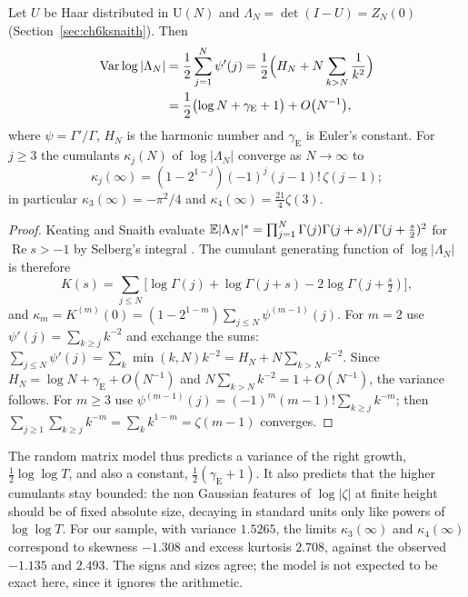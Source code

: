 \begin{proposition}\label{prop:09bks}
Let $U$ be Haar distributed in $\mathrm{U}(N)$ and $\Lambda_N=\det(I-U)=Z_N(0)$ (Section~\ref{sec:ch6ksnaith}). Then
\begin{align*}
\operatorname{Var}\log|\Lambda_N|&=\frac12\sum_{j=1}^N\psi'(j)=\frac12\Bigl(H_N+N\sum_{k>N}\frac1{k^2}\Bigr)\\
&=\frac12\bigl(\log N+\gamma_{\mathrm E}+1\bigr)+O\bigl(N^{-1}\bigr),
\end{align*}
where $\psi=\Gamma'/\Gamma$, $H_N$ is the harmonic number and $\gamma_{\mathrm E}$ is Euler's constant. For $j\ge3$ the cumulants $\kappa_j(N)$ of $\log|\Lambda_N|$ converge as $N\to\infty$ to
\[
\kappa_j(\infty)=(1-2^{1-j})(-1)^j(j-1)!\,\zeta(j-1);
\]
in particular $\kappa_3(\infty)=-\pi^2/4$ and $\kappa_4(\infty)=\frac{21}{4}\zeta(3)$.
\end{proposition}

\begin{proof}
Keating and Snaith evaluate $\mathbb{E}|\Lambda_N|^s=\prod_{j=1}^N\Gamma(j)\Gamma(j+s)/\Gamma(j+\frac s2)^2$ for $\operatorname{Re}s>-1$ by Selberg's integral \cite{keatingsnaith2000}. The cumulant generating function of $\log|\Lambda_N|$ is therefore
\[
K(s)=\sum_{j\le N}\bigl[\log\Gamma(j)+\log\Gamma(j+s)-2\log\Gamma(j+\tfrac s2)\bigr],
\]
and $\kappa_m=K^{(m)}(0)=(1-2^{1-m})\sum_{j\le N}\psi^{(m-1)}(j)$. For $m=2$ use $\psi'(j)=\sum_{k\ge j}k^{-2}$ and exchange the sums: $\sum_{j\le N}\psi'(j)=\sum_k\min(k,N)k^{-2}=H_N+N\sum_{k>N}k^{-2}$. Since $H_N=\log N+\gamma_{\mathrm E}+O(N^{-1})$ and $N\sum_{k>N}k^{-2}=1+O(N^{-1})$, the variance follows. For $m\ge3$ use $\psi^{(m-1)}(j)=(-1)^m(m-1)!\sum_{k\ge j}k^{-m}$; then $\sum_{j\ge1}\sum_{k\ge j}k^{-m}=\sum_kk^{1-m}=\zeta(m-1)$ converges.
\end{proof}

The random matrix model thus predicts a variance of the right growth, $\frac12\log\log T$, and also a constant, $\frac12(\gamma_{\mathrm E}+1)$. It also predicts that the higher cumulants stay bounded: the non Gaussian features of $\log|\zeta|$ at finite height should be of fixed absolute size, decaying in standard units only like powers of $\log\log T$. For our sample, with variance $1.5265$, the limits $\kappa_3(\infty)$ and $\kappa_4(\infty)$ correspond to skewness $-1.308$ and excess kurtosis $2.708$, against the observed $-1.135$ and $2.493$. The signs and sizes agree; the model is not expected to be exact here, since it ignores the arithmetic.

